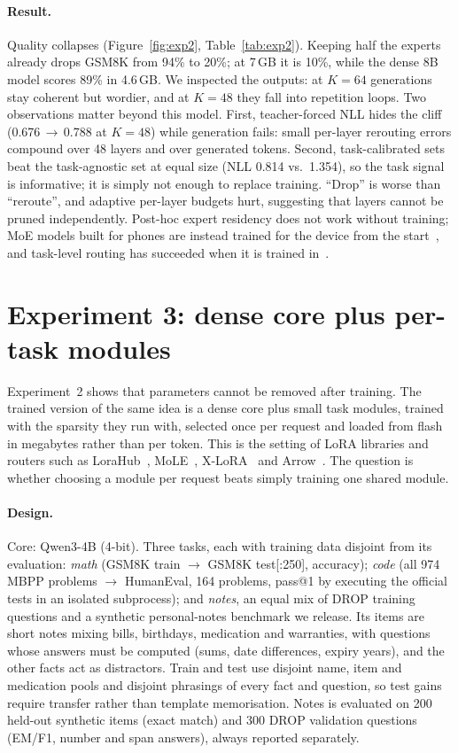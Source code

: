 \documentclass[11pt]{article}
\begin{document}
\paragraph{Result.} Quality collapses (Figure~\ref{fig:exp2}, Table~\ref{tab:exp2}). Keeping half the
experts already drops GSM8K from 94\% to 20\%; at 7\,GB it is 10\%, while the dense 8B model scores 89\% in
4.6\,GB. We inspected the outputs: at $K{=}64$ generations stay coherent but wordier, and at $K{=}48$ they
fall into repetition loops. Two observations matter beyond this model. First, teacher-forced NLL hides the
cliff (0.676\,$\to$\,0.788 at $K{=}48$) while generation fails: small per-layer rerouting errors compound
over 48 layers and over generated tokens. Second, task-calibrated sets beat the task-agnostic set at equal
size (NLL 0.814 vs.\ 1.354), so the task signal is informative; it is simply not enough to replace
training. ``Drop'' is worse than ``reroute'', and adaptive per-layer budgets hurt, suggesting that layers
cannot be pruned independently. Post-hoc expert residency does not work without training; MoE models
built for phones are instead trained for the device from the start~\cite{mobilemoe}, and task-level
routing has succeeded when it is trained in~\cite{kudugunta2021beyond}.

\section{Experiment 3: dense core plus per-task modules}
\label{sec:exp3}
Experiment~2 shows that parameters cannot be removed after training. The trained version of the same idea
is a dense core plus small task modules, trained with the sparsity they run with, selected once per
request and loaded from flash in megabytes rather than per token. This is the setting of LoRA libraries
and routers such as LoraHub~\cite{huang2023lorahub}, MoLE~\cite{wu2024mole}, X-LoRA~\cite{buehler2024xlora}
and Arrow~\cite{ostapenko2024arrow}. The question is whether choosing a module per request beats simply
training one shared module.

\paragraph{Design.} Core: Qwen3-4B (4-bit). Three tasks, each with training data disjoint from its evaluation:
\emph{math} (GSM8K train $\to$ GSM8K test[:250], accuracy); \emph{code} (all 974 MBPP problems $\to$
HumanEval, 164 problems, pass@1 by executing the official tests in an isolated subprocess); and
\emph{notes}, an equal mix of DROP training questions and a synthetic personal-notes benchmark we
release. Its items are short notes mixing bills, birthdays, medication and warranties, with questions
whose answers must be computed (sums, date differences, expiry years), and the other facts act as
distractors. Train and test use disjoint name, item and medication pools and disjoint phrasings of every
fact and question, so test gains require transfer rather than template memorisation. Notes is evaluated on
200 held-out synthetic items (exact match) and 300 DROP validation questions (EM/F1, number and span
answers), always reported separately.
\end{document}
